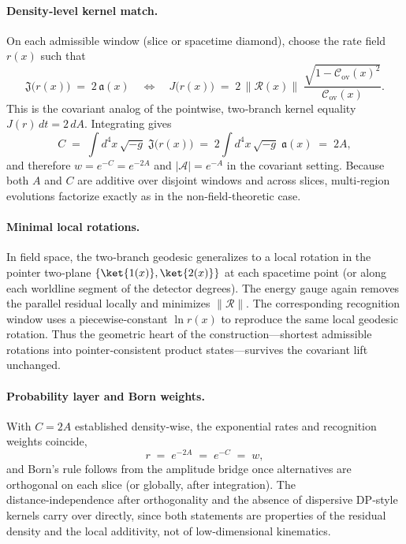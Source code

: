 \documentclass[11pt,letterpaper]{article}
\theoremstyle{definition}
\begin{document}
\paragraph{Density‑level kernel match.}
On each admissible window (slice or spacetime diamond), choose the rate field \(r(x)\) such that
\begin{equation}
\mathfrak J\bigl(r(x)\bigr)\;=\;2\,\mathfrak a(x)
\quad\Longleftrightarrow\quad
J\!\bigl(r(x)\bigr)\;=\;2\,\bigl\|\mathcal R(x)\bigr\|\;\frac{\sqrt{1-\mathcal C_{\mathrm{ov}}(x)^2}}{\mathcal C_{\mathrm{ov}}(x)}.
\end{equation}
This is the covariant analog of the pointwise, two‑branch kernel equality \(J(r)\,dt=2\,dA\). Integrating gives
\begin{equation}
C\;=\;\int d^4x\,\sqrt{-g}\;\mathfrak J\bigl(r(x)\bigr)
\;=\;2\int d^4x\,\sqrt{-g}\;\mathfrak a(x)
\;=\;2A,
\end{equation}
and therefore \(w=e^{-C}=e^{-2A}\) and \(|\mathcal A|=e^{-A}\) in the covariant setting. Because both \(A\) and \(C\) are additive over disjoint windows and across slices, multi‑region evolutions factorize exactly as in the non‑field‑theoretic case.

\paragraph{Minimal local rotations.}
In field space, the two‑branch geodesic generalizes to a local rotation in the pointer two‑plane \(\{\ket{1(x)},\ket{2(x)}\}\) at each spacetime point (or along each worldline segment of the detector degrees). The energy gauge again removes the parallel residual locally and minimizes \(\|\mathcal R\|\). The corresponding recognition window uses a piecewise‑constant \(\ln r(x)\) to reproduce the same local geodesic rotation. Thus the geometric heart of the construction—shortest admissible rotations into pointer‑consistent product states—survives the covariant lift unchanged.
\paragraph{Probability layer and Born weights.}
With \(C=2A\) established density‑wise, the exponential rates and recognition weights coincide,
\begin{equation}
r\;=\;e^{-2A}\;=\;e^{-C}\;=\;w,
\end{equation}
and Born’s rule follows from the amplitude bridge once alternatives are orthogonal on each slice (or globally, after integration). The distance‑independence after orthogonality and the absence of dispersive DP‑style kernels carry over directly, since both statements are properties of the residual density and the local additivity, not of low‑dimensional kinematics.
\medskip
\end{document}

